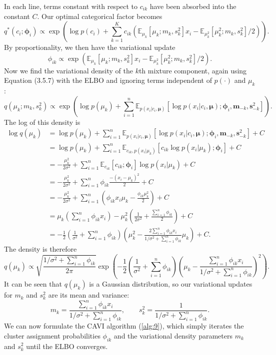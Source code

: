 \documentclass[honours,12pt]{unswthesis}
\numberwithin{equation}{section}
\theoremstyle{definition}
\begin{document}
In each line, terms constant with respect to $c_{ik}$ have been absorbed into the constant $C$. Our optimal categorical factor becomes
\[q^*(c_i;\bm{\phi}_i)\propto \exp \left(\log p(c_i)+\sum_{k=1}^Kc_{ik}\left(\mathbb{E}_{\mu_k}[\mu_k;m_k,s^2_k]x_i-\mathbb{E}_{\mu^2_k}[\mu^2_k;m_k,s^2_k]/2\right)\right).\]
By proportionality, we then have the variational update
\[\phi_{ik}\propto \exp\left(\mathbb{E}_{\mu_k}[\mu_k;m_k,s^2_k]x_i-\mathbb{E}_{\mu^2_k}[\mu^2_k;m_k,s^2_k]/2\right).\]
Now we find the variational density of the $k$th mixture component, again using Equation (3.5.7) with the ELBO and ignoring terms independent of $p(\cdot)$ and $\mu_k$:
\[q(\mu_k;m_k,s^2_k)\propto \exp \left(\log p(\mu_k)+\sum^n_{i=1}\mathbb{E}_{p(x_i|c_i,\bm{\mu})}[\log p(x_i|c_i,\bm{\mu});\bm{\phi}_i, \bm{m}_{-k},\bm{s}^2_{-k}]\right).\]
The log of this density is
\begin{align*}
\log q(\mu_k)&=\log p(\mu_k)+\sum_{i=1}^n \mathbb{E}_{p(x_i|c_i,\bm{\mu})}[\log p(x_i|c_i,\bm{\mu});\bm{\phi}_i,\bm{m}_{-k},\bm{s}^2_{-k}]+C\\
&= \log p(\mu_k)+\sum_{i=1}^n\mathbb{E}_{c_{ik},p(x_i|\mu_k)}[c_{ik}\log p(x_i|\mu_k);\bm{\phi}_i]+C\\
&= -\frac{\mu^2_k}{2\sigma^2}+\sum^n_{i=1}\mathbb{E}_{c_{ik}}[c_{ik};\bm{\phi}_i]\log p(x_i|\mu_k)+C\\
&= -\frac{\mu^2_k}{2\sigma^2}+\sum^n_{i=1}\phi_{ik}\frac{-(x_i-\mu_k)^2}{2}+C\\
&= -\frac{\mu^2_k}{2\sigma^2}+\sum^n_{i=1} \left(\phi_{ik}x_i\mu_k-\frac{\phi_{ik}\mu^2_k}{2}\right)+C\\
&= \mu_k\left(\sum^n_{i=1}\phi_{ik}x_i\right)-\mu_k^2\left(\frac{1}{2\sigma^2}+\frac{\sum^n_{i=1}\phi_{ik}}{2}\right)+C\\
&= -\frac{1}{2}\left(\frac{1}{\sigma^2}+\sum^n_{i=1}\phi_{ik}\right)\left(\mu_k^2-\frac{2\sum^n_{i=1}\phi_{ik}x_i}{1/\sigma^2+\sum^n_{i=1}\phi_{ik}}\mu_k\right)+C.
\end{align*}
The density is therefore
\[q(\mu_k)\propto \sqrt{\frac{1/\sigma^2+\sum^n_{i=1}\phi_{ik}}{2\pi}}\exp\left(-\frac{1}{2}\left(\frac{1}{\sigma^2}+\sum^n_{i=1}\phi_{ik}\right) \left(\mu_k-\frac{\sum^n_{i=1}\phi_{ik}x_i}{1/\sigma^2+\sum^n_{i=1}\phi_{ik}}\right)^2\right).\]
It can be seen that $q(\mu_k)$ is a Gaussian distribution, so our variational updates for $m_k$ and $s^2_k$ are its mean and variance:
\[m_k=\frac{\sum^n_{i=1}\phi_{ik}x_i}{1/\sigma^2+\sum^n_{i=1}\phi_{ik}}, \qquad s^2_k=\frac{1}{1/\sigma^2+\sum^n_{i=1}\phi_{ik}}.\]
We can now formulate the CAVI algorithm (\autoref{alg:9}), which simply iterates the cluster assignment probabilities $\phi_{ik}$ and the variational density parameters $m_k$ and $s^2_k$ until the ELBO converges.
\end{document}
